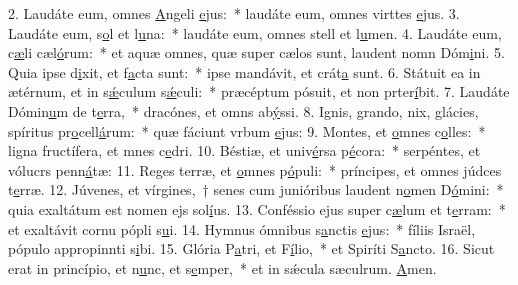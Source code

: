 2. Laudáte eum, omnes \uline{A}ngeli \uline{e}jus:~* laudáte eum, omnes virttes \uline{e}jus.
3. Laudáte eum, s\uline{o}l et l\uline{u}na:~* laudáte eum, omnes stell et l\uline{u}men.
4. Laudáte eum, c\uline{æ}li cæl\uline{ó}rum:~* et aquæ omnes, quæ super cælos sunt, laudent nomn Dóm\uline{i}ni.
5. Quia ipse d\uline{i}xit, et f\uline{a}cta sunt:~* ipse mandávit, et crát\uline{a} sunt.
6. Státuit ea in ætérnum, et in s\uline{ǽ}culum s\uline{ǽ}culi:~* præcéptum pósuit, et non prter\uline{í}bit.
7. Laudáte Dómin\uline{u}m de t\uline{e}rra,~* dracónes, et omns ab\uline{ý}ssi.
8. Ignis, grando, nix, glácies, spíritus pr\uline{o}cell\uline{á}rum:~* quæ fáciunt vrbum \uline{e}jus:
9. Montes, et \uline{o}mnes c\uline{o}lles:~* ligna fructífera, et mnes c\uline{e}dri.
10. Béstiæ, et univ\uline{é}rsa p\uline{é}cora:~* serpéntes, et vólucrs penn\uline{á}tæ:
11. Reges terræ, et \uline{o}mnes p\uline{ó}puli:~* príncipes, et omnes júdces t\uline{e}rræ.
12. Júvenes, et vírgines,~† senes cum junióribus laudent n\uline{o}men D\uline{ó}mini:~* quia exaltátum est nomen ejs sol\uline{í}us.
13. Conféssio ejus super c\uline{æ}lum et t\uline{e}rram:~* et exaltávit cornu pópli s\uline{u}i.
14. Hymnus ómnibus s\uline{a}nctis \uline{e}jus:~* fíliis Israël, pópulo appropinnti s\uline{i}bi.
15. Glória P\uline{a}tri, et F\uline{í}lio,~* et Spiríti S\uline{a}ncto.
16. Sicut erat in princípio, et n\uline{u}nc, et s\uline{e}mper,~* et in sǽcula sæculrum. \uline{A}men.
